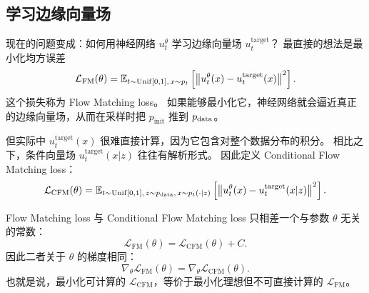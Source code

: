 \subsection{学习边缘向量场}

现在的问题变成：如何用神经网络 $u_t^\theta$ 学习边缘向量场 $u_t^{\mathrm{target}}$？
最直接的想法是最小化均方误差
\begin{equation}
\mathcal{L}_{\mathrm{FM}}(\theta)
=
\mathbb{E}_{t\sim \mathrm{Unif}[0,1],\,x\sim p_t}
\left[
\left\|
u_t^\theta(x)-u_t^{\mathrm{target}}(x)
\right\|^2
\right].
\end{equation}
这个损失称为 Flow Matching loss。
如果能够最小化它，神经网络就会逼近真正的边缘向量场，从而在采样时把 $p_{\mathrm{init}}$ 推到 $p_{\mathrm{data}}$。

但实际中 $u_t^{\mathrm{target}}(x)$ 很难直接计算，因为它包含对整个数据分布的积分。
相比之下，条件向量场 $u_t^{\mathrm{target}}(x|z)$ 往往有解析形式。
因此定义 Conditional Flow Matching loss：
\begin{equation}
\mathcal{L}_{\mathrm{CFM}}(\theta)
=
\mathbb{E}_{t\sim \mathrm{Unif}[0,1],\,z\sim p_{\mathrm{data}},\,x\sim p_t(\cdot|z)}
\left[
\left\|
u_t^\theta(x)-u_t^{\mathrm{target}}(x|z)
\right\|^2
\right].
\end{equation}

\begin{theorem}
\label{thm:flow_matching_loss}
Flow Matching loss 与 Conditional Flow Matching loss 只相差一个与参数 $\theta$ 无关的常数：
\begin{equation*}
\mathcal{L}_{\mathrm{FM}}(\theta)
=
\mathcal{L}_{\mathrm{CFM}}(\theta)+C.
\end{equation*}
因此二者关于 $\theta$ 的梯度相同：
\begin{equation*}
\nabla_\theta \mathcal{L}_{\mathrm{FM}}(\theta)
=
\nabla_\theta \mathcal{L}_{\mathrm{CFM}}(\theta).
\end{equation*}
也就是说，最小化可计算的 $\mathcal{L}_{\mathrm{CFM}}$，等价于最小化理想但不可直接计算的 $\mathcal{L}_{\mathrm{FM}}$。
\end{theorem}

